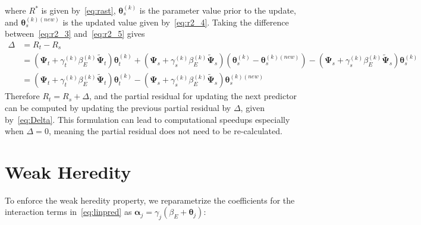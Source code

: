 \documentclass[12pt,letter]{article}\usepackage[]{graphicx}\usepackage[]{color}
\newcommand{\balpha}{\boldsymbol{\alpha}}
\newcommand{\btheta}{\boldsymbol{\theta}}
\newcommand{\bPsi}{\boldsymbol{\Psi}}
\begin{document}
where $R^\ast$ is given by~\eqref{eq:rast}, $\btheta_s^{(k)}$ is the parameter value prior to the update, and $\btheta_s^{(k)(new)}$ is the updated value given by~\eqref{eq:r2_4}. Taking the difference between~\eqref{eq:r2_3} and~\eqref{eq:r2_5} gives
\begin{align}
	\Delta & = R_t - R_s \nonumber\\
	& = (\bPsi_t + \gamma_t^{(k)}\beta_E^{(k)} \widetilde{\bPsi}_t)\btheta_t^{(k)} + (\bPsi_s + \gamma_s^{(k)}\beta_E^{(k)} \widetilde{\bPsi}_s)(\btheta_s^{(k)} - \btheta_s^{(k)(new)}) - (\bPsi_s + \gamma_s^{(k)}\beta_E^{(k)} \widetilde{\bPsi}_s)\btheta_s^{(k)} \nonumber\\
	& = (\bPsi_t + \gamma_t^{(k)}\beta_E^{(k)} \widetilde{\bPsi}_t)\btheta_t^{(k)} - (\bPsi_s + \gamma_s^{(k)}\beta_E^{(k)} \widetilde{\bPsi}_s)\btheta_s^{(k)(new)} \label{eq:Delta}
\end{align} 
Therefore $R_t = R_s + \Delta$, and the partial residual for updating the next predictor can be computed by updating the previous partial residual by $\Delta$, given by~\eqref{eq:Delta}. This formulation can lead to computational speedups especially when $\Delta = 0$, meaning the partial residual does not need to be re-calculated.  




\section{Weak Heredity}
To enforce the weak heredity property, we reparametrize the coefficients for the interaction terms in~\eqref{eq:linpred} as $\balpha_{j} = \gamma_{j}  (\beta_E + \btheta_j)$:
\end{document}
